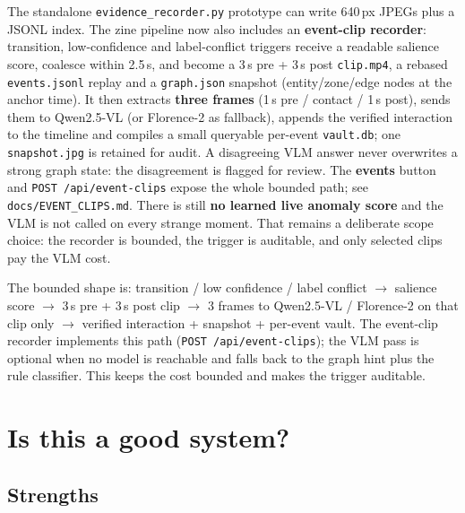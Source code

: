 \documentclass[10pt,a4paper]{article}
\newcommand{\code}[1]{\texttt{\small #1}}
\begin{document}
\noindent
The standalone \code{evidence\_recorder.py} prototype can write 640\,px JPEGs plus a JSONL index. The zine pipeline now also includes an \textbf{event-clip recorder}: transition, low-confidence and label-conflict triggers receive a readable salience score, coalesce within 2.5\,s, and become a 3\,s pre + 3\,s post \code{clip.mp4}, a rebased \code{events.jsonl} replay and a \code{graph.json} snapshot (entity/zone/edge nodes at the anchor time). It then extracts \textbf{three frames} (1\,s pre / contact / 1\,s post), sends them to Qwen2.5-VL (or Florence-2 as fallback), appends the verified interaction to the timeline and compiles a small queryable per-event \code{vault.db}; one \code{snapshot.jpg} is retained for audit. A disagreeing VLM answer never overwrites a strong graph state: the disagreement is flagged for review. The \textbf{events} button and \code{POST /api/event-clips} expose the whole bounded path; see \code{docs/EVENT\_CLIPS.md}. There is still \textbf{no learned live anomaly score} and the VLM is not called on every strange moment. That remains a deliberate scope choice: the recorder is bounded, the trigger is auditable, and only selected clips pay the VLM cost.

\noindent
The bounded shape is: transition / low confidence / label conflict $\rightarrow$ salience score $\rightarrow$ 3\,s pre + 3\,s post clip $\rightarrow$ 3 frames to Qwen2.5-VL / Florence-2 on that clip only $\rightarrow$ verified interaction + snapshot + per-event vault. The event-clip recorder implements this path (\code{POST /api/event-clips}); the VLM pass is optional when no model is reachable and falls back to the graph hint plus the rule classifier. This keeps the cost bounded and makes the trigger auditable.

\section{Is this a good system?}

\subsection*{Strengths}
\end{document}

